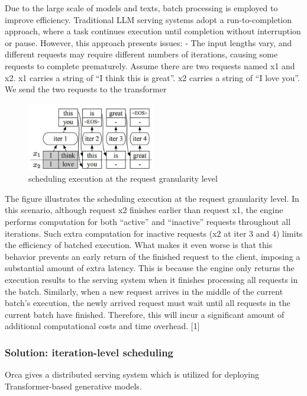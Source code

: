 \documentclass[conference]{IEEEtran}
\begin{document}
Due to the large scale of models and texts, batch processing is employed to improve efficiency. Traditional LLM serving systems adopt a run-to-completion approach, where a task continues execution until completion without interruption or pause. However, this approach presents issues:
- The input lengths vary, and different requests may require different numbers of iterations, causing some requests to complete prematurely.
Assume there are two requests named x1 and x2. x1 carries a string of “I think this is great”. x2 carries a string of “I love you”. We send the two requests to the transformer
\begin{figure}[htbp]
    \centerline{\includegraphics[width=0.5\textwidth]{process fig1.png}}
    \caption{scheduling execution at the request granularity level}
    \label{fig}
\end{figure}
The figure illustrates the scheduling execution at the request granularity level. In this scenario,
although request x2 finishes earlier than request x1, the engine performs computation for both “active” and “inactive” requests throughout all iterations. Such extra computation for inactive requests (x2 at iter 3 and 4) limits the efficiency of batched execution. What makes it even worse is that this behavior prevents an early return of the finished request to the client, imposing a substantial amount of extra latency. This is because the engine only returns the execution results to the serving system when it finishes processing all requests in the batch. Similarly, when a new request arrives in the middle of the current batch’s execution, the newly arrived request must wait until all requests in the current batch have finished. Therefore, this will incur a significant amount of additional computational costs and time overhead. [1]


\subsubsection{Solution: iteration-level scheduling}


Orca gives a distributed serving system which is utilized for deploying Transformer-based generative models.
\end{document}
